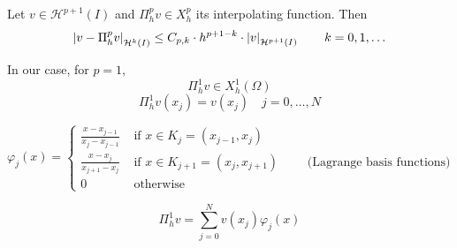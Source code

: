 \begin{theorem}
  Let $v\in\mathcal{H}^{p+1}(I)$ and $\Pi_h^p v \in X_h^p$ its interpolating function. Then
  \[
    \left\vert v-\Pi_h^p v \right\vert_{\mathcal{H}^k(I)} \leq C_{p,k}\cdot h^{p+1-k}\cdot\left\vert v \right\vert_{\mathcal{H}^{p+1}(I)} \qquad k=0,1,\ldots
  \]
  
  In our case, for $p=1$,
  $$\Pi_h^1 v \in X_h^1(\Omega)$$
  $$\Pi_h^1 v(x_j) = v(x_j) \quad j=0,\ldots,N$$
  
  \[
    \varphi_j(x) = \begin{cases}
      \frac{x-x_{j-1}}{x_j - x_{j-1}}   &\text{ if } x \in K_j=(x_{j-1},x_j)\\[8pt]
      \frac{x-x_{j}}{x_{j+1} - x_j} &\text{ if } x\in K_{j+1} = (x_j,x_{j+1}) \qquad \text{ (Lagrange basis functions)} \\[8pt]
      0 &\text{ otherwise}
  \end{cases}
  \]
  
  $$\Pi_h^1 v = \sum_{j=0}^N v(x_j)\varphi_j(x)$$
\end{theorem}

